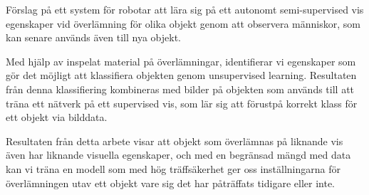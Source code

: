 Förslag på ett system för robotar att lära sig på ett autonomt semi-supervised vis egenskaper vid överlämning för olika objekt genom att observera människor, som kan senare används även till nya objekt.

Med hjälp av inspelat material på överlämningar, identifierar vi egenskaper som gör det möjligt att klassifiera objekten genom unsupervised learning. Resultaten från denna klassifiering kombineras med bilder på objekten som används till att träna ett nätverk på ett supervised vis, som lär sig att förustpå korrekt klass för ett objekt via bilddata.

Resultaten från detta arbete visar att objekt som överlämnas på liknande vis även har liknande visuella egenskaper, och med en begränsad mängd med data kan vi träna en modell som med hög träffsäkerhet ger oss inställningarna för överlämningen utav ett objekt vare sig det har påträffats tidigare eller inte.

